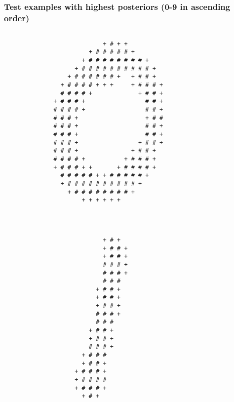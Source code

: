 \begin{multicols*}{2}
\subsubsection{Test examples with highest posteriors (0-9 in ascending order)}
\begin{Verbatim}[samepage=true]
                                                        
                            + # + +                     
                        + # # # # # +                   
                      + # # # # # # # # +               
                    + # # # # # # # # # # +             
                  + # # # # # # +   + # # +             
                + # # # # + + +     + # # # +           
                # # # # +             + # # +           
              + # # # +                 # # +           
              # # # # +                 # # +           
              # # # +                   + # #           
              # # # +                   # # +           
              # # # +                   # # +           
              # # # +                 + # # +           
              # # # +               + # # +             
              # # # # +           + # # # +             
              + # # # + +       + # # # # +             
                # # # # # + + # # # # # +               
                + # # # # # # # # # # +                 
                  + # # # # # # # # +                   
                      + + + + + +                       
                                                        
\end{Verbatim}
\begin{Verbatim}[samepage=true]

                                                        
                            + # +                       
                            + # # +                     
                            + # # +                     
                            # # # +                     
                            # # # +                     
                            # # #                       
                          + # # +                       
                          + # # +                       
                          + # # +                       
                          # # # +                       
                          # # #                         
                        + # # +                         
                        + # # +                         
                        # # # +                         
                      + # # #                           
                      + # # +                           
                    + # # # +                           
                    + # # # #                           
                    + # # # +                           
                      + # +                             
                                                        

\end{Verbatim}
\end{multicols*}
